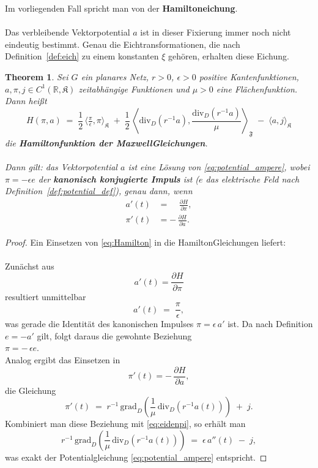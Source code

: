 \documentclass[11pt,a4paper,leqno]{report}
\newtheorem{theorem}{Theorem}[chapter]
\numberwithin{equation}{chapter}
\begin{document}
Im vorliegenden Fall spricht man von der \textbf{Hamiltoneichung}.  \\
\\
Das verbleibende Vektorpotential \(a\) ist in dieser Fixierung 
immer noch nicht eindeutig bestimmt. 
Genau die Eichtransformationen, die nach Definition~\ref{def:eich} 
zu einem konstanten \(\xi\) gehören, erhalten diese Eichung. 
\begin{theorem} \label{thm:hamiltongl}
	Sei \( G \) ein planares Netz, 
	\( r>0 \), \(\epsilon>0\) positive Kantenfunktionen, 
	\( a,\pi,j \in C^{1}(\mathbb{R}, \mathfrak{K}) \) zeitabhängige Funktionen 
	und \(\mu > 0 \) eine Flächenfunktion.  
	Dann heißt 
	\begin{equation}\label{eq:Hamilton}
		H(\pi, a) \;=\; 
		\frac{1}{2}\,\langle \tfrac{\pi}{\epsilon}, \pi \rangle_{\mathfrak{K}}
		\;+\; \frac{1}{2}\,\left\langle \mathrm{div}_D(r^{-1}a), 
		\frac{\mathrm{div}_D(r^{-1}a)}{\mu} \right\rangle_{\mathfrak{F}}
		\;-\; \langle a, j \rangle_{\mathfrak{K}}
	\end{equation}
	die \textbf{Hamiltonfunktion der Maxwell\-Gleichungen}. \\
	\\
	Dann gilt: 
	das Vektorpotential \(a\) ist eine Lösung von \eqref{eq:potential_ampere}, 
	wobei \(\pi = - \epsilon e\) der \textbf{kanonisch konjugierte Impuls} ist 
	(\(e\) das elektrische Feld nach Definition~\ref{def:potential_def}), 
	genau dann, wenn
	\begin{align}
		a'(t) &= \;\;\;\;\frac{\partial H}{\partial \pi}, \\[4pt]
		\pi'(t) &= -\,\frac{\partial H}{\partial a}.
	\end{align}
\end{theorem}
\begin{proof}
	Ein Einsetzen von \eqref{eq:Hamilton} in die Hamilton\-Gleichungen liefert:\\
	\\
	Zunächst aus
	\[
	a'(t) = \frac{\partial H}{\partial \pi}
	\]
	resultiert unmittelbar
	\begin{equation}\label{eq:eidenpi}
		a'(t) \;=\; \frac{\pi}{\epsilon},
	\end{equation}
	was gerade die Identität des kanonischen Impulses \(\pi = \epsilon\,a'\) ist.  
	Da nach Definition \(e = -a'\) gilt, folgt daraus die gewohnte Beziehung\\
	\(\pi = -\,\epsilon e\).
	\\
	Analog ergibt das Einsetzen in
	\[
	\pi'(t) = -\,\frac{\partial H}{\partial a},
	\]
	die Gleichung
	\begin{equation}
		\pi'(t) \;=\; r^{-1}\,\mathrm{grad}_D 
		\left( \frac{1}{\mu}\,\mathrm{div}_D\!\left(r^{-1} a(t)\right)\right) \;+\; j.
	\end{equation}
	Kombiniert man diese Beziehung mit \eqref{eq:eidenpi}, so erhält man
	\begin{equation}
		r^{-1}\,\mathrm{grad}_D 
		\left( \frac{1}{\mu}\,\mathrm{div}_D\!\left(r^{-1} a(t)\right)\right) 
		\;=\; \epsilon\,a''(t) \;-\; j,
	\end{equation}
	was exakt der Potentialgleichung \eqref{eq:potential_ampere} entspricht.
\end{proof}
\end{document}
